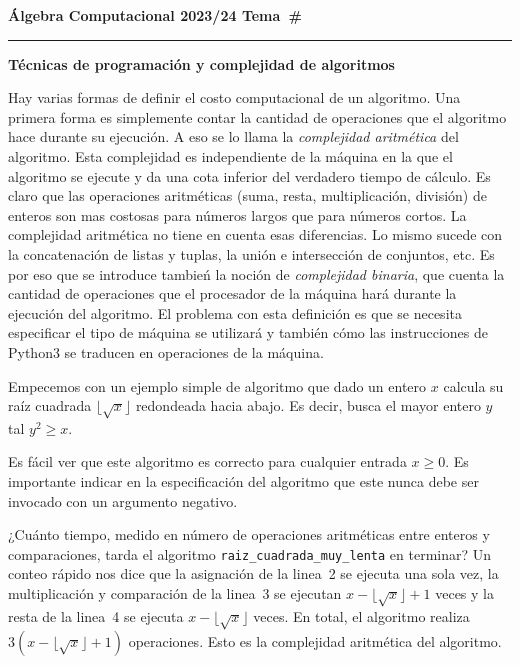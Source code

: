 \documentclass[a4paper, 11pt]{article}
\newcounter{numerodetema}
\newcommand\tema[1]{{\eject\stepcounter{numerodetema}\bf Álgebra Computacional
2023/24 \hfill Tema~\#\arabic{numerodetema}}\par\smallskip\hrule\bigskip\par
\begin{center}{\Large\bf #1}\end{center}}
\theoremstyle{plain}
\theoremstyle{definition}
\begin{document}
\setcounter{numerodetema}{1}
\tema{Técnicas de programación y complejidad de algoritmos}

Hay varias formas de definir el costo computacional de un algoritmo. Una
primera forma es simplemente contar la cantidad de operaciones que el
algoritmo hace durante su ejecución. A eso se lo llama la \textit{complejidad
aritmética} del algoritmo. Esta complejidad es independiente de la máquina
en la que el algoritmo se ejecute y da una cota inferior del verdadero tiempo
de cálculo. Es claro que las operaciones aritméticas (suma, resta, multiplicación,
división) de enteros son mas costosas para números largos que para números
cortos. La complejidad aritmética no tiene en cuenta esas diferencias. Lo
mismo sucede con la concatenación de listas y tuplas, la unión e intersección
de conjuntos, etc. Es por eso que se introduce tambień la noción de
\textit{complejidad binaria}, que cuenta la cantidad de operaciones que el
procesador de la máquina hará durante la ejecución del algoritmo. El
problema con esta definición es que se necesita especificar el tipo de
máquina se utilizará y también cómo las instrucciones de Python3 se
traducen en operaciones de la máquina.

\bigskip

Empecemos con un ejemplo simple de algoritmo que dado un entero $x$
calcula su raíz cuadrada $\lfloor\sqrt{x}\rfloor$ redondeada hacia abajo.
Es decir, busca el mayor entero $y$ tal $y^2\geq x$.

\bigskip



\bigskip

Es fácil ver que este algoritmo es correcto para cualquier entrada $x\geq 0$.
Es importante indicar en la especificación del algoritmo que este nunca debe
ser invocado con un argumento negativo.

\bigskip

¿Cuánto tiempo, medido en número de operaciones aritméticas entre enteros
y comparaciones, tarda el algoritmo \texttt{raiz\_cuadrada\_muy\_lenta} en
terminar? Un conteo rápido nos dice que la asignación de la linea~2 se ejecuta
una sola vez, la multiplicación y comparación de la linea~3 se ejecutan
$x-\lfloor\sqrt{x}\rfloor+1$ veces y la resta de la linea~4 se ejecuta
$x-\lfloor\sqrt{x}\rfloor$ veces. En total, el algoritmo realiza
$3(x-\lfloor\sqrt{x}\rfloor+1)$ operaciones. Esto es la complejidad aritmética
del algoritmo.
\end{document}
